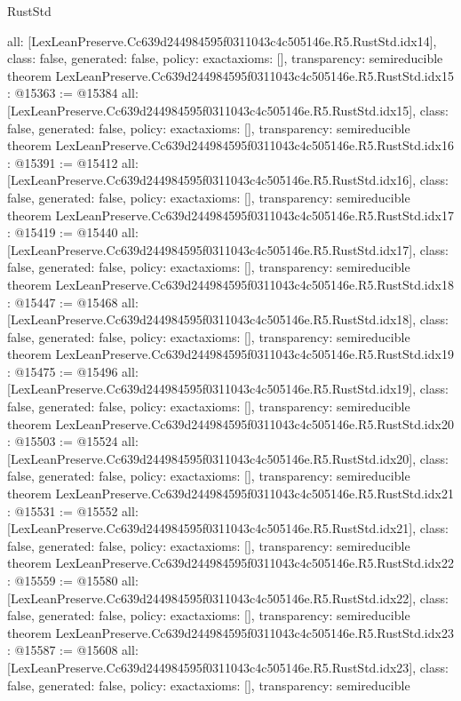 \begin{lexlean}{RustStd}
\begin{coremodule}
{  all: [LexLeanPreserve.Cc639d244984595f0311043c4c505146e.R5.RustStd.idx14],
  class: false,
  generated: false,
  policy: exact{axioms: []},
  transparency: semireducible
}
theorem LexLeanPreserve.Cc639d244984595f0311043c4c505146e.R5.RustStd.idx15 : @15363 := @15384 {
  all: [LexLeanPreserve.Cc639d244984595f0311043c4c505146e.R5.RustStd.idx15],
  class: false,
  generated: false,
  policy: exact{axioms: []},
  transparency: semireducible
}
theorem LexLeanPreserve.Cc639d244984595f0311043c4c505146e.R5.RustStd.idx16 : @15391 := @15412 {
  all: [LexLeanPreserve.Cc639d244984595f0311043c4c505146e.R5.RustStd.idx16],
  class: false,
  generated: false,
  policy: exact{axioms: []},
  transparency: semireducible
}
theorem LexLeanPreserve.Cc639d244984595f0311043c4c505146e.R5.RustStd.idx17 : @15419 := @15440 {
  all: [LexLeanPreserve.Cc639d244984595f0311043c4c505146e.R5.RustStd.idx17],
  class: false,
  generated: false,
  policy: exact{axioms: []},
  transparency: semireducible
}
theorem LexLeanPreserve.Cc639d244984595f0311043c4c505146e.R5.RustStd.idx18 : @15447 := @15468 {
  all: [LexLeanPreserve.Cc639d244984595f0311043c4c505146e.R5.RustStd.idx18],
  class: false,
  generated: false,
  policy: exact{axioms: []},
  transparency: semireducible
}
theorem LexLeanPreserve.Cc639d244984595f0311043c4c505146e.R5.RustStd.idx19 : @15475 := @15496 {
  all: [LexLeanPreserve.Cc639d244984595f0311043c4c505146e.R5.RustStd.idx19],
  class: false,
  generated: false,
  policy: exact{axioms: []},
  transparency: semireducible
}
theorem LexLeanPreserve.Cc639d244984595f0311043c4c505146e.R5.RustStd.idx20 : @15503 := @15524 {
  all: [LexLeanPreserve.Cc639d244984595f0311043c4c505146e.R5.RustStd.idx20],
  class: false,
  generated: false,
  policy: exact{axioms: []},
  transparency: semireducible
}
theorem LexLeanPreserve.Cc639d244984595f0311043c4c505146e.R5.RustStd.idx21 : @15531 := @15552 {
  all: [LexLeanPreserve.Cc639d244984595f0311043c4c505146e.R5.RustStd.idx21],
  class: false,
  generated: false,
  policy: exact{axioms: []},
  transparency: semireducible
}
theorem LexLeanPreserve.Cc639d244984595f0311043c4c505146e.R5.RustStd.idx22 : @15559 := @15580 {
  all: [LexLeanPreserve.Cc639d244984595f0311043c4c505146e.R5.RustStd.idx22],
  class: false,
  generated: false,
  policy: exact{axioms: []},
  transparency: semireducible
}
theorem LexLeanPreserve.Cc639d244984595f0311043c4c505146e.R5.RustStd.idx23 : @15587 := @15608 {
  all: [LexLeanPreserve.Cc639d244984595f0311043c4c505146e.R5.RustStd.idx23],
  class: false,
  generated: false,
  policy: exact{axioms: []},
  transparency: semireducible
}
\end{coremodule}
\end{lexlean}
